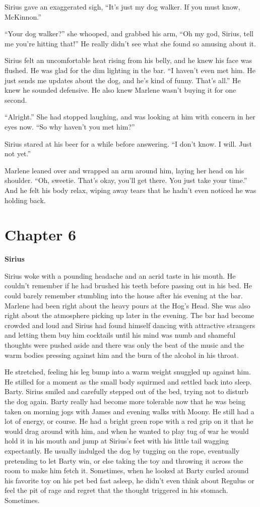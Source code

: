 \documentclass[12pt,twoside,openright]{memoir}
\begin{document}
Sirius gave an exaggerated sigh, ``It's just my dog walker. If you must know, McKinnon.''

``Your dog walker?'' she whooped, and grabbed his arm, ``Oh my god, Sirius, tell me you're hitting that!'' He really didn't see what she found so amusing about it.

Sirius felt an uncomfortable heat rising from his belly, and he knew his face was flushed. He was glad for the dim lighting in the bar. ``I haven't even met him. He just sends me updates about the dog, and he's kind of funny. That's all.'' He knew he sounded defensive. He also knew Marlene wasn't buying it for one second. 

``Alright.'' She had stopped laughing, and was looking at him with concern in her eyes now. ``So why haven't you met him?''

Sirius stared at his beer for a while before answering. ``I don't know. I will. Just not yet.''

Marlene leaned over and wrapped an arm around him, laying her head on his shoulder. ``Oh, sweetie. That's okay, you'll get there. You just take your time.'' And he felt his body relax, wiping away tears that he hadn't even noticed he was holding back.

\chapter*{Chapter 6}

\textbf{Sirius} 

Sirius woke with a pounding headache and an acrid taste in his mouth. He couldn't remember if he had brushed his teeth before passing out in his bed. He could barely remember stumbling into the house after his evening at the bar. Marlene had been right about the heavy pours at the Hog's Head. She was also right about the atmosphere picking up later in the evening. The bar had become crowded and loud and Sirius had found himself dancing with attractive strangers and letting them buy him cocktails until his mind was numb and shameful thoughts were pushed aside and there was only the beat of the music and the warm bodies pressing against him and the burn of the alcohol in his throat.

He stretched, feeling his leg bump into a warm weight snuggled up against him. He stilled for a moment as the small body squirmed and settled back into sleep. Barty. Sirius smiled and carefully stepped out of the bed, trying not to disturb the dog again. Barty really had become more tolerable now that he was being taken on morning jogs with James and evening walks with Moony. He still had a lot of energy, or course. He had a bright green rope with a red grip on it that he would drag around with him, and when he wanted to play tug of war he would hold it in his mouth and jump at Sirius's feet with his little tail wagging expectantly. He usually indulged the dog by tugging on the rope, eventually pretending to let Barty win, or else taking the toy and throwing it across the room to make him fetch it. Sometimes, when he looked at Barty curled around his favorite toy on his pet bed fast asleep, he didn't even think about Regulus or feel the pit of rage and regret that the thought triggered in his stomach. Sometimes.
\end{document}
